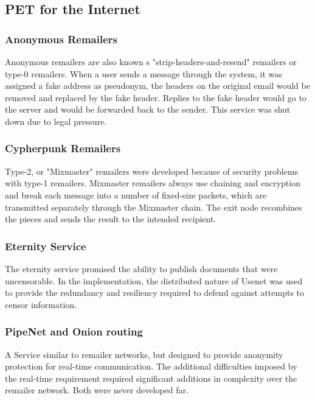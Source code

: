 \documentclass[a4paper, 10 pt, conference]{ieeeconf}
\begin{document}
\subsection{\textbf{PET for the Internet}}

\subsubsection{\textbf{Anonymous Remailers}}
Anonymous remailers are also known s "strip-headers-and-resend" remailers or type-0 remailers. When a user sends a message through the system, it was assigned a fake address as pseudonym, the headers on the original email would be removed and replaced by the fake header. Replies to the fake header would go to the server and would be forwarded back to the sender. 
This service was shut down due to legal pressure. 
\vspace{0.5cm}
\subsubsection{\textbf{Cypherpunk Remailers}}
Type-2, or "Mixmaster" remailers were developed because of security problems with type-1 remailers. Mixmaster remailers always use chaining and encryption and break each message into a number of fixed-size packets, which are transmitted separately through the Mixmaster chain. The exit node recombines the pieces and sends the result to the intended recipient. 




\vspace{0.5cm}
\subsubsection{\textbf{Eternity Service}}
The eternity service promised the ability to publish documents that were uncensorable. In the implementation, the distributed nature of Usenet was used to provide the redundancy and resiliency required to defend against attempts to censor information. 

\vspace{0.5cm}
\subsubsection{\textbf{PipeNet and Onion routing}}
A Service similar to remailer networks, but designed to provide anonymity protection for real-time communication. The additional difficulties imposed by the real-time requirement required significant additions in complexity over the remailer network. Both were never developed far. 
\end{document}
